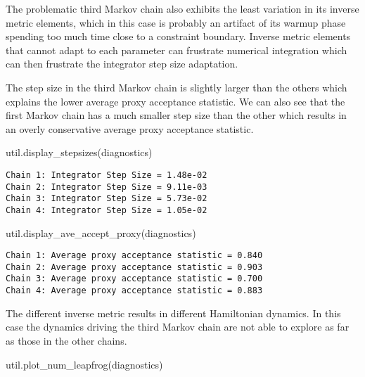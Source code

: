 \documentclass[
  letterpaper,
  DIV=11,
  numbers=noendperiod]{scrartcl}
\newenvironment{Shaded}{\begin{snugshade}}{\end{snugshade}}
\newcommand{\NormalTok}[1]{\textcolor[rgb]{0.00,0.23,0.31}{#1}}
\begin{document}
The problematic third Markov chain also exhibits the least variation in
its inverse metric elements, which in this case is probably an artifact
of its warmup phase spending too much time close to a constraint
boundary. Inverse metric elements that cannot adapt to each parameter
can frustrate numerical integration which can then frustrate the
integrator step size adaptation.

The step size in the third Markov chain is slightly larger than the
others which explains the lower average proxy acceptance statistic. We
can also see that the first Markov chain has a much smaller step size
than the other which results in an overly conservative average proxy
acceptance statistic.

\begin{Shaded}
\begin{Highlighting}[]
\NormalTok{util.display\_stepsizes(diagnostics)}
\end{Highlighting}
\end{Shaded}

\begin{verbatim}
Chain 1: Integrator Step Size = 1.48e-02
Chain 2: Integrator Step Size = 9.11e-03
Chain 3: Integrator Step Size = 5.73e-02
Chain 4: Integrator Step Size = 1.05e-02
\end{verbatim}

\begin{Shaded}
\begin{Highlighting}[]
\NormalTok{util.display\_ave\_accept\_proxy(diagnostics)}
\end{Highlighting}
\end{Shaded}

\begin{verbatim}
Chain 1: Average proxy acceptance statistic = 0.840
Chain 2: Average proxy acceptance statistic = 0.903
Chain 3: Average proxy acceptance statistic = 0.700
Chain 4: Average proxy acceptance statistic = 0.883
\end{verbatim}

The different inverse metric results in different Hamiltonian dynamics.
In this case the dynamics driving the third Markov chain are not able to
explore as far as those in the other chains.

\begin{Shaded}
\begin{Highlighting}[]
\NormalTok{util.plot\_num\_leapfrog(diagnostics)}
\end{Highlighting}
\end{Shaded}
\end{document}
